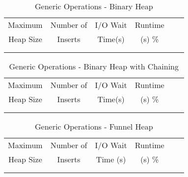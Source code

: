 \documentclass[11pt, one-sided]{amsart}
\begin{document}



\begin{table}[htbp]
   \centering
      \caption{Generic Operations - Binary Heap}
   \begin{tabular}{|c|c|c|c|c|c|}
   	\hline
		 Maximum   	& 	Number of 	& I/O Wait		& Runtime 	 \\ 
		 Heap Size		&	Inserts	& Time(s)		&	(s)		 		\%		\\ \hline	
		 			&				&			&						\\
		 			&				&			&						\\
   \end{tabular}
   \label{tab:booktabs}
\end{table}


\begin{table}[htbp]
   \centering
      \caption{Generic Operations - Binary Heap with Chaining}
   \begin{tabular}{|c|c|c|c|c|c|}
   	\hline
		 Maximum   	& 	Number of 	& I/O Wait		& Runtime 	 \\ 
		 Heap Size		&	Inserts	& Time(s)		&	(s)		 		\%		\\ \hline	
		 			&				&			&						\\
		 			&				&			&						\\
   \end{tabular}
   \label{tab:booktabs}
\end{table}


\begin{table}[htbp]
   \centering
      \caption{Generic Operations - Funnel Heap}
   \begin{tabular}{|c|c|c|c|c|c|}
   	\hline
		 Maximum   	& 	Number of 	& I/O Wait		& Runtime 	 \\ 
		 Heap Size		&	Inserts	& Time (s)		&	(s)		 		\%		\\ \hline	
		 			&				&			&						\\
		 			&				&			&						\\
   \end{tabular}
   \label{tab:booktabs}
\end{table}
\end{document}
